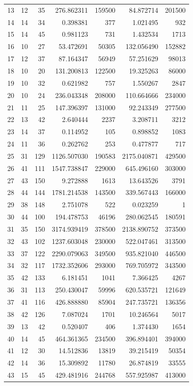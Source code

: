 \documentclass{article}
\begin{document}
\begin{landscape}
\begin{longtable}{rrrrrrr}
13 & 12 & 35 & 276.862311 & 159500 & 84.872714 & 201500 \\
14 & 14 & 34 & 0.398381 & 377 & 1.021495 & 932 \\
15 & 14 & 45 & 0.981123 & 731 & 1.432534 & 1713 \\
16 & 10 & 27 & 53.472691 & 50305 & 132.056490 & 152882 \\
17 & 12 & 37 & 87.164347 & 56949 & 57.251629 & 98013 \\
18 & 10 & 20 & 131.200813 & 122500 & 19.325263 & 86000 \\
19 & 10 & 32 & 0.621982 & 757 & 1.550267 & 2847 \\
20 & 10 & 24 & 236.043348 & 208000 & 110.664666 & 234000 \\
21 & 11 & 25 & 147.396397 & 131000 & 92.243349 & 277500 \\
22 & 13 & 42 & 2.640444 & 2237 & 3.208711 & 3212 \\
23 & 14 & 37 & 0.114952 & 105 & 0.898852 & 1083 \\
24 & 11 & 36 & 0.262762 & 253 & 0.477877 & 717 \\
25 & 31 & 129 & 1126.507030 & 190583 & 2175.040871 & 429500 \\
26 & 41 & 111 & 1547.738847 & 229000 & 645.496160 & 303000 \\
27 & 43 & 150 & 9.272888 & 1613 & 13.643526 & 3791 \\
28 & 44 & 144 & 1781.214538 & 143500 & 339.567443 & 166000 \\
29 & 38 & 148 & 2.751078 & 522 & 0.023259 & 1 \\
30 & 44 & 100 & 194.478753 & 46196 & 280.062545 & 180591 \\
31 & 35 & 150 & 3174.939419 & 378500 & 2138.890752 & 373500 \\
32 & 43 & 102 & 1237.603048 & 230000 & 522.047461 & 313500 \\
33 & 37 & 122 & 2290.079063 & 349500 & 935.821040 & 446500 \\
34 & 32 & 117 & 1732.352606 & 293000 & 769.705972 & 343500 \\
35 & 42 & 133 & 6.181451 & 1041 & 7.366425 & 4267 \\
36 & 31 & 113 & 250.430047 & 59996 & 620.535721 & 121649 \\
37 & 41 & 116 & 426.888880 & 85904 & 247.735721 & 136356 \\
38 & 42 & 126 & 7.087024 & 1701 & 10.246564 & 5017 \\
39 & 13 & 42 & 0.520407 & 406 & 1.374430 & 1654 \\
40 & 14 & 45 & 464.361365 & 234500 & 396.894401 & 394000 \\
41 & 12 & 30 & 14.512836 & 13819 & 39.215419 & 50354 \\
42 & 14 & 36 & 15.309892 & 11780 & 26.874819 & 33555 \\
43 & 15 & 45 & 429.481916 & 244768 & 557.925987 & 413000 \\
\end{longtable}


\end{landscape}
\end{document}
